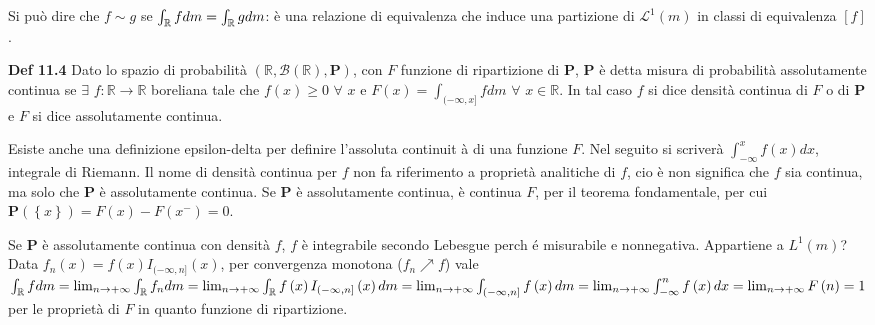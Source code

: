 \documentclass{article}
\begin{document}
Si pu\`{o} dire che $f\sim g$ se $\int_{%
\mathbb{R}
}fdm=\int_{%
\mathbb{R}
}gdm$: \`{e} una relazione di equivalenza che induce una partizione di $%
\mathcal{L}^{1}\left( m\right) $ in classi di equivalenza $\left[ f\right] $%
. 

\textbf{Def 11.4} Dato lo spazio di probabilit\`{a} $\left( 
\mathbb{R}
,\mathcal{B}\left( 
\mathbb{R}
\right) ,\mathbf{P}\right) $, con $F$ funzione di ripartizione di $\mathbf{P}
$, $\mathbf{P}$ \`{e} detta misura di probabilit\`{a} assolutamente continua
se $\exists $ $f:%
\mathbb{R}
\rightarrow 
\mathbb{R}
$ boreliana tale che $f\left( x\right) \geq 0$ $\forall $ $x$ e $F\left(
x\right) =\int_{(-\infty ,x]}fdm$ $\forall $ $x\in 
\mathbb{R}
$. In tal caso $f$ si dice densit\`{a} continua di $F$ o di $\mathbf{P}$ e $%
F $ si dice assolutamente continua.

Esiste anche una definizione epsilon-delta per definire l'assoluta continuit%
\`{a} di una funzione $F$. Nel seguito si scriver\`{a} $\int_{-\infty
}^{x}f\left( x\right) dx$, integrale di Riemann. Il nome di densit\`{a}
continua per $f$ non fa riferimento a propriet\`{a} analitiche di $f$, cio%
\`{e} non significa che $f$ sia continua, ma solo che $\mathbf{P}$ \`{e}
assolutamente continua. Se $\mathbf{P}$ \`{e} assolutamente continua, \`{e}
continua $F$, per il teorema fondamentale, per cui $\mathbf{P}\left( \left\{
x\right\} \right) =F\left( x\right) -F\left( x^{-}\right) =0$.

Se $\mathbf{P}$ \`{e} assolutamente continua con densit\`{a} $f$, $f$ \`{e}
integrabile secondo Lebesgue perch%
\'{e} misurabile e nonnegativa. Appartiene a $L^{1}\left( m\right) $? Data $%
f_{n}\left( x\right) =f\left( x\right) I_{(-\infty ,n]}\left( x\right) $,
per convergenza monotona ($f_{n}\nearrow f$) vale $\int_{%
\mathbb{R}
}fdm=\lim_{n\rightarrow +\infty }\int_{%
\mathbb{R}
}f_{n}dm=\lim_{n\rightarrow +\infty }\int_{%
\mathbb{R}
}f\left( x\right) I_{(-\infty ,n]}\left( x\right) dm=\lim_{n\rightarrow
+\infty }\int_{(-\infty ,n]}f\left( x\right) dm=\lim_{n\rightarrow
+\infty }\int_{-\infty }^{n}f\left( x\right) dx=\lim_{n\rightarrow +\infty
}F\left( n\right) =1$ per le propriet\`{a} di $F$ in quanto funzione di
ripartizione.
\end{document}
